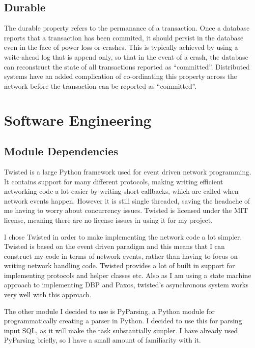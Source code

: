\documentclass[12pt,twoside,notitlepage]{report}
\begin{document}
\subsection*{Durable}

The durable property refers to the permanance of a transaction. Once a database reports that a
transaction has been commited, it should persist in the database even in the face of power loss or
crashes. This is typically achieved by using a write-ahead log that is append only, so that in the
event of a crash, the database can reconstruct the state of all transactions reported as
``committed''. Distributed systems have an added complication of co-ordinating this property
across the network before the transaction can be reported as ``committed''.

\section{Software Engineering}

\subsection{Module Dependencies}

Twisted is a large Python framework used for event driven network programming. It contains support
for many different protocols, making writing efficient networking code a lot easier by writing
short callbacks, which are called when network events happen. However it is still single threaded,
saving the headache of me having to worry about concurrency issues. Twisted is licensed under the
MIT license, meaning there are no license issues in using it for my project.

I chose Twisted in order to make implementing the network code a lot simpler. Twisted is based on
the event driven paradigm and this means that I can construct my code in terms of network events,
rather than having to focus on writing network handling code. Twisted provides a lot of built in
support for implementing protocols and helper classes etc. Also as I am using a state machine
approach to implementing DBP and Paxos, twisted's asynchronous system works very well with this
approach.

The other module I decided to use is PyParsing, a Python module for programmatically creating a
parser in Python. I decided to use this for parsing input SQL, as it will make the task
substantially simpler. I have already used PyParsing briefly, so I have a small amount of
familiarity with it.
\end{document}
